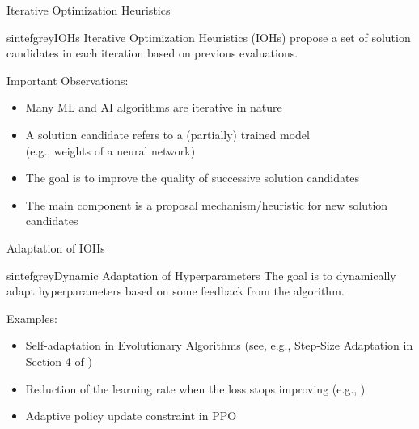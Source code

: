 \documentclass[main]{subfiles}
\begin{document}
\begin{frame}{Iterative Optimization Heuristics}
\begin{colorblock}[black]{sintefgrey}{IOHs}
Iterative Optimization Heuristics (IOHs) propose a set of solution candidates in each iteration based on previous evaluations.
\end{colorblock}
\pause
Important Observations:
\begin{itemize}
    \item Many ML and AI algorithms are iterative in nature\pause
    \item A solution candidate refers to a (partially) trained model\\ (e.g., weights of a neural network)\pause
    \item The goal is to improve the quality of successive solution candidates\pause
    \item The main component is a proposal mechanism/heuristic for new solution candidates
\end{itemize}
\end{frame}
\begin{frame}{Adaptation of IOHs}
\begin{colorblock}[black]{sintefgrey}{Dynamic Adaptation of Hyperparameters}
The goal is to dynamically adapt hyperparameters based on some feedback from the algorithm.
\end{colorblock}
Examples:\\
\begin{itemize}
    \item Self-adaptation in Evolutionary Algorithms (see, e.g., Step-Size Adaptation in Section 4 of )
    \item Reduction of the learning rate when the loss stops improving (e.g., )
    \item Adaptive policy update constraint in PPO 
\end{itemize}
\end{frame}
\end{document}

